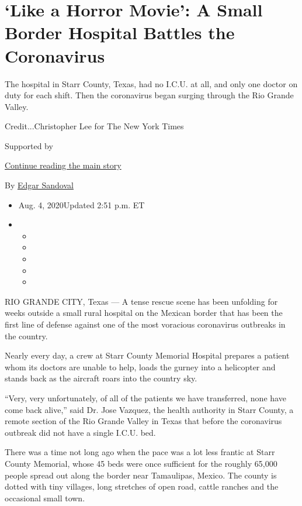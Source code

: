 \hypertarget{like-a-horror-movie-a-small-border-hospital-battles-the-coronavirus}{%
\section{`Like a Horror Movie': A Small Border Hospital Battles the
Coronavirus}\label{like-a-horror-movie-a-small-border-hospital-battles-the-coronavirus}}

The hospital in Starr County, Texas, had no I.C.U. at all, and only one
doctor on duty for each shift. Then the coronavirus began surging
through the Rio Grande Valley.

Credit...Christopher Lee for The New York Times

Supported by

\protect\hyperlink{after-sponsor}{Continue reading the main story}

By \href{https://www.nytimes.com/by/edgar-sandoval}{Edgar Sandoval}

\begin{itemize}
\item
  Aug. 4, 2020Updated 2:51 p.m. ET
\item
  \begin{itemize}
  \item
  \item
  \item
  \item
  \item
  \end{itemize}
\end{itemize}

RIO GRANDE CITY, Texas --- A tense rescue scene has been unfolding for
weeks outside a small rural hospital on the Mexican border that has been
the first line of defense against one of the most voracious coronavirus
outbreaks in the country.

Nearly every day, a crew at Starr County Memorial Hospital prepares a
patient whom its doctors are unable to help, loads the gurney into a
helicopter and stands back as the aircraft roars into the country sky.

``Very, very unfortunately, of all of the patients we have transferred,
none have come back alive,'' said Dr. Jose Vazquez, the health authority
in Starr County, a remote section of the Rio Grande Valley in Texas that
before the coronavirus outbreak did not have a single I.C.U. bed.

There was a time not long ago when the pace was a lot less frantic at
Starr County Memorial, whose 45 beds were once sufficient for the
roughly 65,000 people spread out along the border near Tamaulipas,
Mexico. The county is dotted with tiny villages, long stretches of open
road, cattle ranches and the occasional small town.

